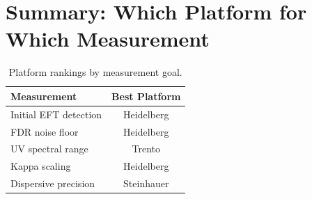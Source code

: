 \documentclass[aps,prd,twocolumn,showpacs,superscriptaddress,nofootinbib]{revtex4-2}
\begin{document}
\section{Summary: Which Platform for Which Measurement}

\begin{table}[h]
\caption{Platform rankings by measurement goal.}
\label{tab:rankings}
\begin{ruledtabular}
\begin{tabular}{lc}
Measurement & Best Platform \\
\hline
Initial EFT detection & Heidelberg \\
FDR noise floor & Heidelberg \\
UV spectral range & Trento \\
Kappa scaling & Heidelberg \\
Dispersive precision & Steinhauer \\
\end{tabular}
\end{ruledtabular}
\end{table}
\end{document}
